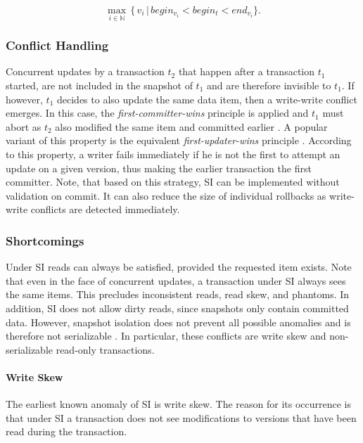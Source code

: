 \[
\operatorname*{max}_{i \in \mathbb{N}}\, \{\, v_i\, |\, begin_{v_i} < begin_t < end_{v_i}\}.
\]

\subsubsection{Conflict Handling}

Concurrent updates by a transaction $t_2$ that happen after a transaction $t_1$
started, are not included in the snapshot of $t_1$ and are therefore invisible
to $t_1$. If however, $t_1$ decides to also update the same data item, then a
write-write conflict emerges. In this case, the \emph{first-committer-wins}
principle is applied and $t_1$ must abort as $t_2$ also modified the same item
and committed earlier \cite{berenson1995critique}. A popular variant of this
property is the equivalent \emph{first-updater-wins} principle
\cite{fekete2004read, larson2011high}. According to this property, a writer
fails immediately if he is not the first to attempt an update on a given
version, thus making the earlier transaction the first committer. Note, that
based on this strategy, SI can be implemented without validation on commit. It
can also reduce the size of individual rollbacks as write-write conflicts are
detected immediately.

\subsubsection{Shortcomings}

Under SI reads can always be satisfied, provided the requested item exists. Note
that even in the face of concurrent updates, a transaction under SI always sees
the same items. This precludes inconsistent reads, read skew, and phantoms. In
addition, SI does not allow dirty reads, since snapshots only contain committed
data. However, snapshot isolation does not prevent all possible anomalies and is
therefore not serializable \cite{berenson1995critique, fekete2004read}. In
particular, these conflicts are write skew and non-serializable read-only
transactions.

\paragraph{Write Skew}

The earliest known anomaly of SI is write skew. The reason for its occurrence is
that under SI a transaction does not see modifications to versions that have
been read during the transaction.

